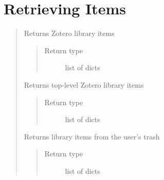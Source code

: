 \documentclass[letterpaper,10pt,english]{sphinxmanual}
\begin{document}
\section{Retrieving Items}
\label{index:retrieving-items}\begin{quote}

\begin{fulllineitems}
\label{index:pyzotero.zotero.Zotero.items}
Returns Zotero library items
\begin{quote}\begin{description}
\item[{Return type}] \leavevmode
list of dicts

\end{description}\end{quote}

\end{fulllineitems}


\begin{fulllineitems}
\label{index:pyzotero.zotero.Zotero.top}
Returns top-level Zotero library items
\begin{quote}\begin{description}
\item[{Return type}] \leavevmode
list of dicts

\end{description}\end{quote}

\end{fulllineitems}


\begin{fulllineitems}
\label{index:pyzotero.zotero.Zotero.trash}
Returns library items from the user's trash
\begin{quote}\begin{description}
\item[{Return type}] \leavevmode
list of dicts

\end{description}\end{quote}

\end{fulllineitems}


\end{quote}
\end{document}
